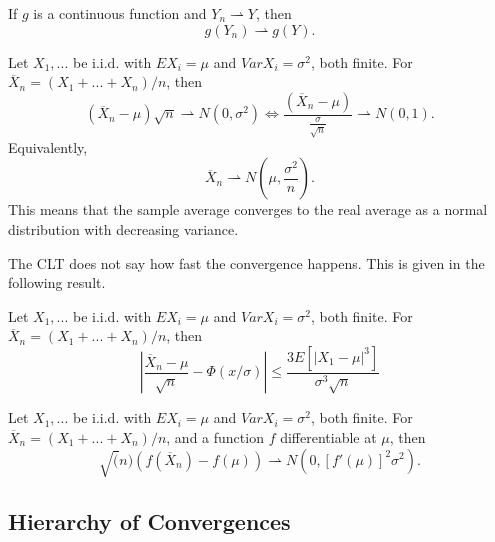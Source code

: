 \begin{corollary}
	If $g$ is a continuous function and $Y_n \rightharpoonup Y$, then
	\begin{equation}
		g(Y_n) \rightharpoonup g(Y).
	\end{equation}
\end{corollary}

\begin{theorem}
	Let $X_1,...$ be i.i.d. with $EX_i = \mu$ and $Var X_i = \sigma^2$, both finite.
	For $\overline{X}_n = (X_1+...+X_n)/n$, then
	\begin{equation}
		(\overline{X}_n - \mu)\sqrt n \rightharpoonup N(0,\sigma^2) \iff
		\frac{(\overline{X}_n - \mu)}
		{\frac{\sigma}{\sqrt n}} \rightharpoonup N(0,1).
	\end{equation}
	Equivalently,
	\begin{equation}
		\overline{X}_n \rightharpoonup N(\mu,\frac{\sigma^2}{n}).
	\end{equation}
	This means that the sample average converges to the real average
	as a normal distribution with decreasing variance.
\end{theorem}

The CLT does not say how fast the
convergence happens. This is given in the following result.

\begin{theorem}
	Let $X_1,...$ be i.i.d. with $EX_i = \mu$ and $Var X_i = \sigma^2$, both finite.
	For $\overline{X}_n = (X_1+...+X_n)/n$, then
	\begin{equation}
		|\frac{\overline{X}_n - \mu}{\sqrt{n}} - \Phi(x/\sigma)| \leq
		\frac{3E[|X_1 - \mu|^3]}{\sigma^3 \sqrt n}
	\end{equation}
\end{theorem}

\begin{theorem}
	Let $X_1,...$ be i.i.d. with $EX_i = \mu$ and $Var X_i = \sigma^2$, both finite.
	For $\overline{X}_n = (X_1+...+X_n)/n$, and a function $f$ differentiable at $\mu$, then
	\begin{equation}
		\sqrt(n)(f(\overline{X}_n) - f(\mu)) \rightharpoonup N(0,[f'(\mu)]^2\sigma^2).
	\end{equation}
\end{theorem}

\subsection{Hierarchy of Convergences}

